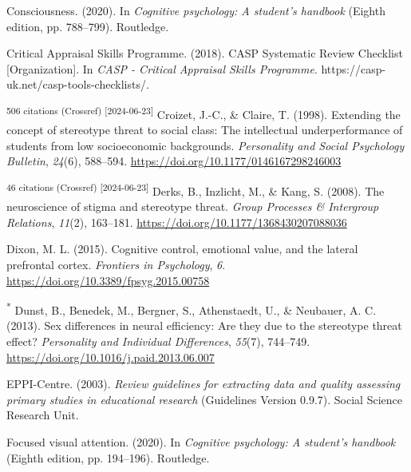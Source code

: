 \documentclass[
  stu, a4paper,floatsintext]{apa7}
\newlength{\cslhangindent}
\newenvironment{CSLReferences}[2] %
 {\begin{list}{}{%
  \setlength{\itemindent}{0pt}
  \setlength{\leftmargin}{0pt}
  \setlength{\parsep}{0pt}
  \ifodd #1
   \setlength{\leftmargin}{\cslhangindent}
   \setlength{\itemindent}{-1\cslhangindent}
  \fi
  \setlength{\itemsep}{#2\baselineskip}}}
 {\end{list}}
\begin{document}
\begin{CSLReferences}{1}{0}
Consciousness. (2020). In \emph{Cognitive psychology: A student's handbook} (Eighth edition, pp. 788--799). Routledge.

Critical Appraisal Skills Programme. (2018). {CASP Systematic Review Checklist} {[}Organization{]}. In \emph{CASP - Critical Appraisal Skills Programme}. https://casp-uk.net/casp-tools-checklists/.

\textsuperscript{506 citations (Crossref) {[}2024-06-23{]}} Croizet, J.-C., \& Claire, T. (1998). Extending the concept of stereotype threat to social class: {The} intellectual underperformance of students from low socioeconomic backgrounds. \emph{Personality and Social Psychology Bulletin}, \emph{24}(6), 588--594. \url{https://doi.org/10.1177/0146167298246003}

\textsuperscript{46 citations (Crossref) {[}2024-06-23{]}} Derks, B., Inzlicht, M., \& Kang, S. (2008). The neuroscience of stigma and stereotype threat. \emph{Group Processes \& Intergroup Relations}, \emph{11}(2), 163--181. \url{https://doi.org/10.1177/1368430207088036}

Dixon, M. L. (2015). Cognitive control, emotional value, and the lateral prefrontal cortex. \emph{Frontiers in Psychology}, \emph{6}. \url{https://doi.org/10.3389/fpsyg.2015.00758}

\textsuperscript{*} Dunst, B., Benedek, M., Bergner, S., Athenstaedt, U., \& Neubauer, A. C. (2013). Sex differences in neural efficiency: {Are} they due to the stereotype threat effect? \emph{Personality and Individual Differences}, \emph{55}(7), 744--749. \url{https://doi.org/10.1016/j.paid.2013.06.007}

EPPI-Centre. (2003). \emph{Review guidelines for extracting data and quality assessing primary studies in educational research} (Guidelines Version 0.9.7). Social Science Research Unit.

Focused visual attention. (2020). In \emph{Cognitive psychology: A student's handbook} (Eighth edition, pp. 194--196). Routledge.


\end{CSLReferences}
\end{document}
